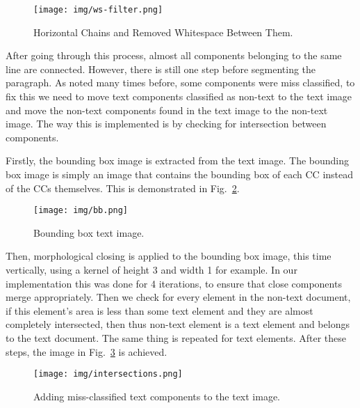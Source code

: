 \documentclass[conference]{IEEEtran}
\begin{document}
    \begin{figure}[htbp]
        \centerline{\texttt{[image: img/ws-filter.png]}}
        \caption{Horizontal Chains and Removed Whitespace Between Them.}
        \label{img:ws-filter}
    \end{figure}

    After going through this process, almost all components belonging to the same line are connected.
    However, there is still one step before segmenting the paragraph.
    As noted many times before, some components were miss classified, to fix this we need to move text
    components classified as non-text to the text image and move the non-text components found in the
    text image to the non-text image.
    The way this is implemented is by checking for intersection between components.

    Firstly, the bounding box image is extracted from the text image.
    The bounding box image is simply an image that contains the bounding box of each CC instead of the CCs
    themselves. This is demonstrated in Fig.~\ref{img:bb}.

    \begin{figure}[htbp]
        \centerline{\texttt{[image: img/bb.png]}}
        \caption{Bounding box text image.}
        \label{img:bb}
    \end{figure}

    Then, morphological closing is applied to the bounding box image, this time vertically, using a kernel of
    height 3 and width 1 for example.
    In our implementation this was done for 4 iterations, to ensure that close components merge appropriately.
    Then we check for every element in the non-text document, if this element's area is less than some
    text element and they are almost completely intersected, then thus non-text element is a text element
    and belongs to the text document.
    The same thing is repeated for text elements.
    After these steps, the image in Fig.~\ref{img:intersections} is achieved.
    
    \begin{figure}[htbp]
        \centerline{\texttt{[image: img/intersections.png]}}
        \caption{Adding miss-classified text components to the text image.}
        \label{img:intersections}
    \end{figure}
\end{document}

